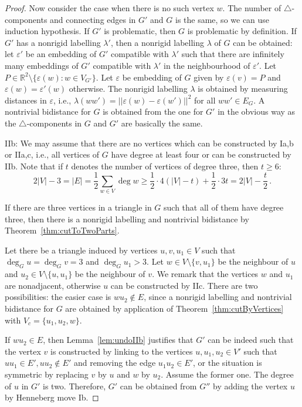 \documentclass[a4paper, 11pt]{article}
\newcommand{\trcomps}{$\triangle$-components}
\newcommand{\RR}{\mathbb{R}}
\theoremstyle{definition}
\begin{document}
\begin{proof}
Now consider the case when there is no such vertex $w$. The number of \trcomps{} and connecting edges in $G'$ and $G$ is the same, so we can use induction hypothesis. If $G'$ is problematic, then $G$ is problematic by definition. If $G'$ has a nonrigid labelling $\lambda'$, then a nonrigid labelling $\lambda$ of $G$ can be obtained: let $\varepsilon'$ be an embedding of $G'$ compatible with $\lambda'$ such that there are infinitely many embeddings of $G'$ compatible with $\lambda'$ in the neighbourhood of $\varepsilon'$. Let $P\in\RR^2\setminus\{\varepsilon(w)\colon w\in V_{G'}\}$. Let $\varepsilon$ be embedding of $G$ given by $\varepsilon(v)=P$ and $\varepsilon(w)=\varepsilon'(w)$ otherwise. The nonrigid labelling $\lambda$ is obtained by measuring distances in $\varepsilon$, i.e., $\lambda(ww')=||\varepsilon(w)-\varepsilon(w')||^2$ for all $ww'\in E_G$.
A nontrivial bidistance for $G$ is obtained from the one for $G'$ in the obvious way as the \trcomps{} in $G$ and $G'$ are basically the same.

IIb: We may assume that there are no vertices which can be constructed by Ia,b or IIa,c, i.e., all vertices of $G$ have degree at least four or can be constructed by IIb. Note that if $t$ denotes the number of vertices of degree three, then $t\geq 6$:
$$
2|V|-3=|E|=\frac{1}{2} \sum_{w\in V} \deg w\geq \frac{1}{2}\cdot 4(|V|-t)+\frac{1}{2}\cdot 3 t=2|V|-\frac{t}{2}\,.
$$

If there are three vertices in a triangle in $G$ such that all of them have degree three, then there is a nonrigid labelling and nontrivial bidistance by Theorem~\ref{thm:cutToTwoParts}.

Let there be a triangle induced by vertices $u,v, u_1\in V$ such that $\deg_G u =\deg_G v=3$ and $\deg_G u_1>3$. Let $w\in V\setminus \{v, u_1\}$ be the neighbour of $u$ and $u_2\in V\setminus \{u, u_1\}$ be the neighbour of $v$. We remark that the vertices $w$ and $u_1$ are nonadjacent, otherwise $u$ can be constructed by IIc. There are two possibilities: the easier case is  $wu_2\notin E$, since  a nonrigid labelling and nontrivial bidistance for $G$ are obtained by application of Theorem~\ref{thm:cutByVertices} with $V_c=\{u_1,u_2,w\}$. 

If $wu_2\in E$, then Lemma~\ref{lem:undoIIb} justifies that $G'$ can be indeed such that the vertex $v$ is constructed by linking to the vertices $u,u_1,u_2 \in V'$ such that $uu_1\in E',uu_2\notin E'$ and removing the edge $u_1u_2\in E'$, or the situation is symmetric by replacing $v$ by $u$ and $w$ by $u_2$. Assume the former one. The degree of $u$ in $G'$ is two. Therefore, $G'$ can be obtained from $G''$ by adding the vertex $u$ by Henneberg move Ib. 


\end{proof}
\end{document}

